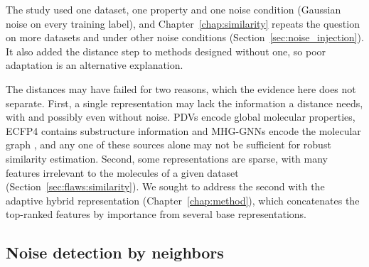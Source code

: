 The study used one dataset, one property and one noise condition (Gaussian noise on every training label), and Chapter~\ref{chap:similarity} repeats the question on more datasets and under other noise conditions (Section~\ref{sec:noise_injection}). It also added the distance step to methods designed without one, so poor adaptation is an alternative explanation.

The distances may have failed for two reasons, which the evidence here does not separate. First, a single representation may lack the information a distance needs, with and possibly even without noise. PDVs encode global molecular properties, ECFP4 contains substructure information and MHG-GNNs encode the molecular graph \citep{kishimoto2023}, and any one of these sources alone may not be sufficient for robust similarity estimation. Second, some representations are sparse, with many features irrelevant to the molecules of a given dataset (Section~\ref{sec:flaws:similarity}). We sought to address the second with the adaptive hybrid representation (Chapter~\ref{chap:method}), which concatenates the top-ranked features by importance from several base representations.


\subsection{Noise detection by neighbors}\label{sec:flaws:neighbors} %

